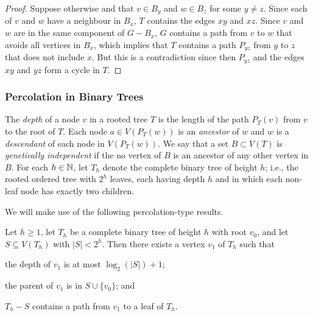 \documentclass{patmorin}
\newcommand{\defin}[1]{\emph{\color{brightmaroon}#1}}
\begin{document}
\begin{proof}
  Suppose otherwise and that $v\in B_y$ and $w\in B_z$ for some $y\neq z$.  Since each of $v$ and $w$ have a neighbour in $B_x$, $T$ contains the edges $xy$ and $xz$.  Since $v$ and $w$ are in the same component of $G-B_x$, $G$ contains a path from $v$ to $w$ that avoids all vertices in $B_x$, which implies that $T$ contains a path $P_{yz}$ from $y$ to $z$ that does not include $x$.  But this is a contradiction since then $P_{yz}$ and the edges $xy$ and $yz$ form a cycle in $T$.
\end{proof}

\subsubsection{Percolation in Binary Trees}


The \defin{depth} of a node $v$ in a rooted tree $T$ is the length of the path $P_T(v)$ from $v$ to the root of $T$.  Each node $a\in V(P_T(w))$ is an \defin{ancestor} of $w$ and $w$ is a \defin{descendant} of each node in $V(P_T(w))$.  We say that a set $B\subset V(T)$ is \defin{genetically independent} if the no vertex of $B$ is an ancestor of any other vertex in $B$.  For each $h\in\mathbb{N}$, let $T_h$ denote the complete binary tree of height $h$; i.e., the rooted ordered tree with $2^h$ leaves, each having depth $h$ and in which each non-leaf node has exactly two children.  

We will make use of the following percolation-type results. 

\begin{lem}\label{one_path}
  Let $h\ge 1$, let $T_h$ be a complete binary tree of height $h$ with root $v_0$, and let $S\subseteq V(T_h)$ with $|S|< 2^h$. Then there exists a vertex $v_1$ of $T_h$ such that
  \begin{compactenum}[(i)]
    \item the depth of $v_1$ is at most $\log_2(|S|)+1$;
    \item the parent of $v_1$ is in $S\cup\{v_0\}$; and
    \item $T_h-S$ contains a path from $v_1$ to a leaf of $T_h$.
  \end{compactenum} 
\end{lem}
\end{document}
